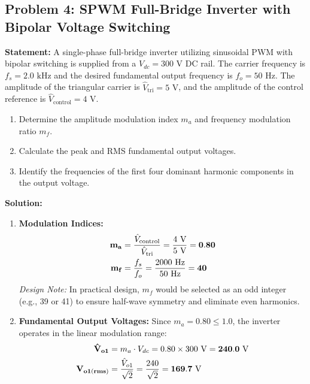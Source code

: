 \documentclass[11pt,a4paper]{article}
\begin{document}
\subsection{Problem 4: SPWM Full-Bridge Inverter with Bipolar Voltage Switching}
\begin{examplebox}
\textbf{Statement:} A single-phase full-bridge inverter utilizing sinusoidal PWM with bipolar switching is supplied from a $V_{dc} = 300\text{ V}$ DC rail. The carrier frequency is $f_s = 2.0\text{ kHz}$ and the desired fundamental output frequency is $f_o = 50\text{ Hz}$. The amplitude of the triangular carrier is $\hat{V}_{\text{tri}} = 5\text{ V}$, and the amplitude of the control reference is $\hat{V}_{\text{control}} = 4\text{ V}$.
\begin{enumerate}
  \item Determine the amplitude modulation index $m_a$ and frequency modulation ratio $m_f$.
  \item Calculate the peak and RMS fundamental output voltages.
  \item Identify the frequencies of the first four dominant harmonic components in the output voltage.
\end{enumerate}

\tcblower
\textbf{Solution:}
\begin{enumerate}
  \item \textbf{Modulation Indices:}
  \begin{align*}
  \mathbf{m_a} &= \frac{\hat{V}_{\text{control}}}{\hat{V}_{\text{tri}}} = \frac{4\text{ V}}{5\text{ V}} = \mathbf{0.80} \notag\\
  \mathbf{m_f} &= \frac{f_s}{f_o} = \frac{2000\text{ Hz}}{50\text{ Hz}} = \mathbf{40}
  \end{align*}
  \textit{Design Note:} In practical design, $m_f$ would be selected as an odd integer (e.g., 39 or 41) to ensure half-wave symmetry and eliminate even harmonics.

  \item \textbf{Fundamental Output Voltages:}
  Since $m_a = 0.80 \le 1.0$, the inverter operates in the linear modulation range:
  \begin{align*}
  \mathbf{\hat{V}_{o1}} &= m_a \cdot V_{dc} = 0.80 \times 300\text{ V} = \mathbf{240.0\text{ V}} \notag\\
  \mathbf{V_{o1(rms)}} &= \frac{\hat{V}_{o1}}{\sqrt{2}} = \frac{240}{\sqrt{2}} = \mathbf{169.7\text{ V}}
  \end{align*}


\end{enumerate}
\end{examplebox}
\end{document}
